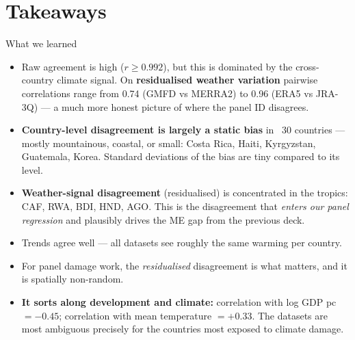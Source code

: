 \documentclass[10pt,aspectratio=169]{beamer}
\begin{document}
\section{Takeaways}

\begin{frame}{What we learned}
  \begin{itemize}
    \item Raw agreement is high ($r \geq 0.992$), but this is dominated by
          the cross-country climate signal. On \textbf{residualised weather
          variation} pairwise correlations range from 0.74 (GMFD vs MERRA2)
          to 0.96 (ERA5 vs JRA-3Q) --- a much more honest picture of where
          the panel ID disagrees.
    \item \textbf{Country-level disagreement is largely a static bias} in
          ~30 countries --- mostly mountainous, coastal, or small:
          Costa Rica, Haiti, Kyrgyzstan, Guatemala, Korea. Standard deviations
          of the bias are tiny compared to its level.
    \item \textbf{Weather-signal disagreement} (residualised) is
          concentrated in the tropics: CAF, RWA, BDI, HND, AGO.
          This is the disagreement that \emph{enters our panel regression} and
          plausibly drives the ME gap from the previous deck.
    \item Trends agree well --- all datasets see roughly the same warming
          per country.
    \item For panel damage work, the \emph{residualised} disagreement is what
          matters, and it is spatially non-random.
    \item \textbf{It sorts along development and climate:} correlation with
          log GDP pc $= -0.45$; correlation with mean temperature $= +0.33$.
          The datasets are most ambiguous precisely for the countries most
          exposed to climate damage.
  \end{itemize}
\end{frame}
\end{document}
